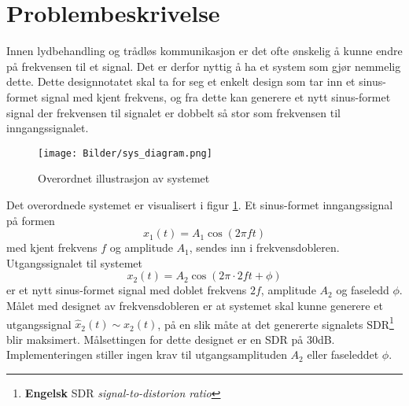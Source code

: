 \section{Problembeskrivelse}
\label{problemBeskrivelse}

Innen lydbehandling og trådløs kommunikasjon er det ofte ønskelig å kunne endre på frekvensen til 
et signal. Det er derfor nyttig å ha et system som gjør nemmelig dette. 
Dette designnotatet skal ta for seg et enkelt design som tar inn et sinus-formet signal med kjent frekvens, og fra dette kan 
generere et nytt sinus-formet signal der frekvensen til signalet er dobbelt så stor som frekvensen til inngangssignalet. 

\begin{figure}[H]
    \centering
    \texttt{[image: Bilder/sys\_diagram.png]}
    \caption{Overordnet illustrasjon av systemet}
    \label{fig:top_level_sys}
\end{figure}

Det overordnede systemet er visualisert i figur \ref{fig:top_level_sys}.
Et sinus-formet inngangssignal på formen 
$$x_1(t) = A_1 \cos{\left(2\pi ft\right)}$$ 
med kjent frekvens $f$ og amplitude $A_1$, sendes inn i frekvensdobleren.
Utgangssignalet til systemet
$$x_2(t) = A_2 \cos{\left(2\pi \cdot 2ft + \phi\right)}$$ 
er et nytt sinus-formet signal med doblet frekvens $2f$, amplitude $A_2$ og faseledd $\phi$.
Målet med designet av frekvensdobleren er at systemet skal kunne generere et utgangssignal $\hat{x}_2(t) \sim x_2(t)$, 
på en slik måte at det genererte signalets SDR\footnote{\textbf{Engelsk} SDR \textit{signal-to-distorion ratio}}
blir maksimert. Målsettingen for dette designet er en SDR på 30dB.
Implementeringen stiller ingen krav til utgangsamplituden $A_2$ eller faseleddet $\phi$.
